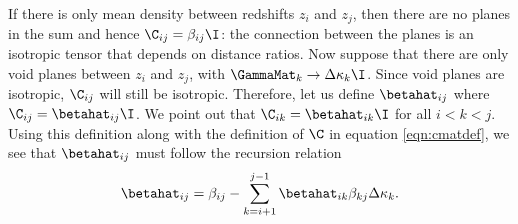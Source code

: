 If there is only mean density between redshifts $z_i$ and $z_j$, then there are no planes in the sum and hence $\C_{i j} = \beta_{i j } \I$: the connection between the planes is an isotropic tensor that depends on distance ratios. Now suppose that there are only void planes between $z_i$ and $z_j$, with $\GammaMat_k \rightarrow \Delta \kappa_k \I$. Since void planes are isotropic, $\C_{i j}$ will still be isotropic. Therefore, let us define $\betahat_{i j}$ where $\C_{i j} = \betahat_{i j} \I$. We point out that $\C_{i k } = \betahat_{i k} \I$ for all $i < k < j$. Using this definition along with the definition of $\C$ in equation \ref{eqn:cmatdef}, we see that $\betahat_{i j}$ must follow the recursion relation
\begin{equation}
\betahat_{i j}  = \beta_{i j} - \sum \limits_{k = i +1}^{j -1} \betahat_{i k} \beta_{k j} \Delta \kappa_k.
\end{equation}
  
